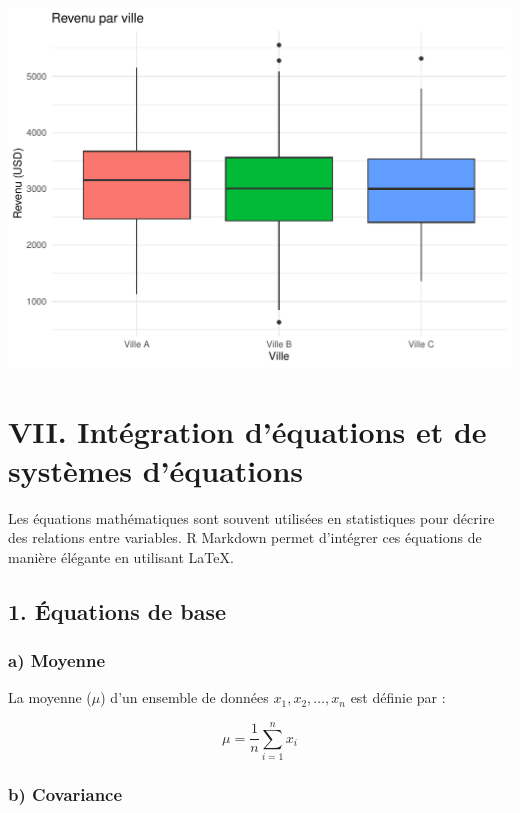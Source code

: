 \documentclass[
]{article}
\begin{document}
\includegraphics{TP_1_files/figure-latex/carte-revenus-1.pdf}

\hypertarget{vii.-intuxe9gration-duxe9quations-et-de-systuxe8mes-duxe9quations}{%
\section{VII. Intégration d'équations et de systèmes
d'équations}\label{vii.-intuxe9gration-duxe9quations-et-de-systuxe8mes-duxe9quations}}

Les équations mathématiques sont souvent utilisées en statistiques pour
décrire des relations entre variables. R Markdown permet d'intégrer ces
équations de manière élégante en utilisant LaTeX.

\hypertarget{uxe9quations-de-base}{%
\subsection{1. Équations de base}\label{uxe9quations-de-base}}

\hypertarget{a-moyenne}{%
\subsubsection{a) Moyenne}\label{a-moyenne}}

La moyenne (\(\mu\)) d'un ensemble de données \(x_1, x_2, \dots, x_n\)
est définie par :

\[
\mu = \frac{1}{n} \sum_{i=1}^{n} x_i
\]

\hypertarget{b-covariance}{%
\subsubsection{b) Covariance}\label{b-covariance}}
\end{document}

